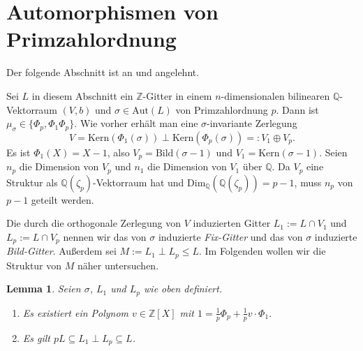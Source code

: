 \documentclass[12pt,a4paper,halfparskip,headsepline,bibtotocnumbered]{scrreprt}
\theoremstyle{nummermitklammern}
\newtheorem{lemma}[defsatzusw]{Lemma}
\theoremstyle{nonumberbreak}
\newcommand{\Z}{\mathbb{Z}}
\newcommand{\Q}{\mathbb{Q}}
\newcommand{\Kern}{\text{Kern}}
\newcommand{\Bild}{\text{Bild}}
\newcommand{\Aut}{\text{Aut}}
\begin{document}
\section{Automorphismen von Primzahlordnung}
Der folgende Abschnitt ist an \cite[Kap. 4]{juergens} und \cite[Kap. 4]{nebe} angelehnt.\par
Sei $L$ in diesem Abschnitt ein $\Z$-Gitter in einem $n$-dimensionalen bilinearen $\Q$-Vektorraum $(V,b)$ und $\sigma \in \Aut(L)$ von Primzahlordnung $p$. Dann ist $\mu_\sigma \in \lbrace \Phi_p, \Phi_1 \Phi_p \rbrace$. Wie vorher erhält man eine $\sigma$-invariante Zerlegung
\begin{equation*}
	V = \Kern(\Phi_1(\sigma)) \perp \Kern(\Phi_p(\sigma)) =: V_1 \oplus V_p.
\end{equation*}
Es ist $\Phi_1(X) = X-1$, also $V_p = \Bild(\sigma - 1)$ und $V_1 = \Kern(\sigma - 1)$. Seien $n_p$ die Dimension von $V_p$ und $n_1$ die Dimension von $V_1$ über $\Q$. Da $V_p$ eine Struktur als $\Q(\zeta_p)$-Vektorraum hat und $\text{Dim}_\Q(\Q(\zeta_p)) = p-1$, muss $n_p$ von $p-1$ geteilt werden.\par

Die durch die orthogonale Zerlegung von $V$ induzierten Gitter $L_1 := L \cap V_1$ und $L_p := L \cap V_p$ nennen wir das von $\sigma$ induzierte \textit{Fix-Gitter} und das von $\sigma$ induzierte \textit{Bild-Gitter}. Außerdem sei
$M := L_1 \perp L_p \leq L$. Im Folgenden wollen wir die Struktur von $M$ näher untersuchen.

\begin{framed}
	\begin{lemma}\label{lem:pL}
		Seien $\sigma$, $L_1$ und $L_p$ wie oben definiert.
		\begin{enumerate}[label=(\roman*)]
			\item Es existiert ein Polynom $v \in \Z\left[ X \right]$ mit $1 = \frac{1}{p}\Phi_p + \frac{1}{p} v \cdot \Phi_1$.
			\item Es gilt $pL \subseteq L_1 \perp L_p \subseteq L$.
		\end{enumerate}
	\end{lemma}
\end{framed}
\end{document}
